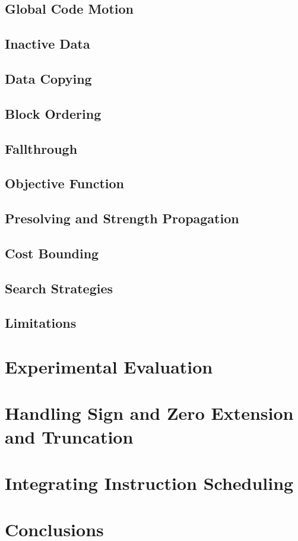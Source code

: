 \documentclass{book}
\begin{document}
\section{Global Code Motion}
\section{Inactive Data}
\section{Data Copying}
\section{Block Ordering}
\section{Fallthrough}
\section{Objective Function}
\section{Presolving and Strength Propagation}
\section{Cost Bounding}
\section{Search Strategies}
\section{Limitations}

\chapter{Experimental Evaluation}

\chapter{Handling Sign and Zero Extension and Truncation}

\chapter{Integrating Instruction Scheduling}

\chapter{Conclusions}
\end{document}
